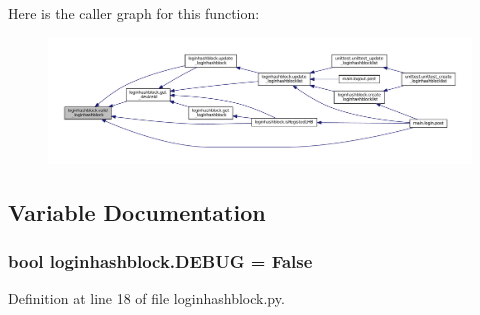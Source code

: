 Here is the caller graph for this function\+:
\nopagebreak
\begin{figure}[H]
\begin{center}
\leavevmode
\includegraphics[width=350pt]{namespaceloginhashblock_ac120dd8384bd51c357e2ad5f6cb2f99a_icgraph}
\end{center}
\end{figure}




\subsection{Variable Documentation}
\subsubsection[{\texorpdfstring{D\+E\+B\+UG}{DEBUG}}]{\setlength{\rightskip}{0pt plus 5cm}bool loginhashblock.\+D\+E\+B\+UG = False}\hypertarget{namespaceloginhashblock_ad198a2ffc3d7bab32167aed00d2f5c65}{}\label{namespaceloginhashblock_ad198a2ffc3d7bab32167aed00d2f5c65}


Definition at line 18 of file loginhashblock.\+py.

